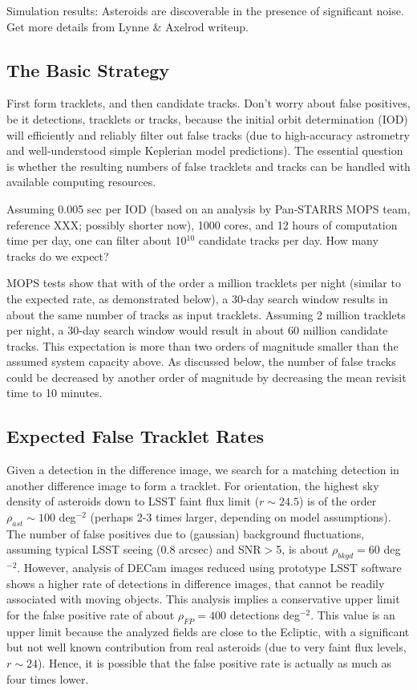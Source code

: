 \documentclass[12pt,preprint]{aastex}
\begin{document}
Simulation results: Asteroids are discoverable in the presence of significant noise.
Get more details from Lynne \& Axelrod writeup. 

\newpage

\subsection{The Basic Strategy} 

First form tracklets, and then candidate tracks. Don't worry about false positives, 
be it detections, tracklets or tracks, because the initial orbit determination (IOD) 
will efficiently and reliably filter out false tracks (due to high-accuracy astrometry 
and well-understood simple Keplerian model predictions). The essential question
is whether the resulting numbers of false tracklets and tracks can be handled with 
available computing resources.

Assuming 0.005 sec per IOD (based on an analysis by Pan-STARRS MOPS team,
reference XXX; possibly shorter now), 1000 cores, and 12 hours of computation time 
per day, one can filter about 10$^{10}$ candidate tracks per day. How many tracks 
do we expect? 

MOPS tests show that with of the order a million tracklets per night (similar to 
the expected rate, as demonstrated below), a 30-day search window results in 
about the same number of tracks as input tracklets. Assuming 2 million tracklets
per night, a 30-day search window would result in about 60 million candidate
tracks. This expectation is more than two orders of magnitude smaller than the 
assumed system capacity above. As discussed below, the number of false tracks
could be decreased by another order of magnitude by decreasing the mean revisit
time to 10 minutes. 


\subsection{Expected False Tracklet Rates} 


Given a detection in the difference image, we search for a matching detection in another
difference image to form a tracklet. For orientation, the highest sky density of asteroids 
down to LSST faint flux limit ($r \sim 24.5$) is of the order $\rho_{ast} \sim 100$ deg$^{-2}$
(perhaps 2-3 times larger, depending on model assumptions). The number of false positives 
due to (gaussian) background fluctuations, assuming typical LSST seeing (0.8 arcsec) and
SNR$>$5, is about $\rho_{bkgd} = 60$ deg$^{-2}$. However, analysis of DECam images reduced 
using prototype LSST software shows a higher rate of detections in difference images, that 
cannot be readily associated with moving objects. This analysis implies a conservative upper
limit for the false positive rate of about $\rho_{FP} =  400$ detections deg$^{-2}$. This value 
is an upper limit because the analyzed fields are close to the Ecliptic, with a significant but
not well known contribution from real asteroids (due to very faint flux levels, $r \sim 24$). 
Hence, it is possible that the false positive rate is actually as much as four times lower. 
\end{document}
